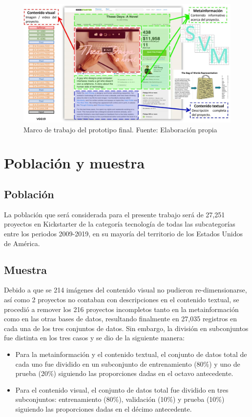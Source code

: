 \begin{figure}[htbp]
	\begin{center}
		\includegraphics[width=1\textwidth]{3/figures/prototipo.jpg}
		\caption{Marco de trabajo del prototipo final. Fuente: Elaboración propia}
		\label{3:fig1}
	\end{center}
\end{figure}

\section{Población y muestra}

\subsection{Población}
La población que será considerada para el presente trabajo será de 27,251 proyectos en Kickstarter de la categoría tecnología de todas las subcategorías entre los periodos 2009-2019, en su mayoría del territorio de los Estados Unidos de América.

\subsection{Muestra}
Debido a que se 214 imágenes del contenido visual no pudieron re-dimensionarse, así como 2 proyectos no contaban con descripciones en el contenido textual, se procedió a remover los 216 proyectos incompletos tanto en la metainformación como en las otras bases de datos, resultando finalmente en 27,035 registros en cada una de los tres conjuntos de datos. Sin embargo, la división en subconjuntos fue distinta en los tres casos y se dio de la siguiente manera:

\begin{itemize}
	\item Para la metainformación y el contenido textual, el conjunto de datos total de cada uno fue dividido en un subconjunto de entrenamiento (80\%) y uno de prueba (20\%) siguiendo las proporciones dadas en el octavo antecedente.
	\item Para el contenido visual, el conjunto de datos total fue dividido en tres subconjuntos: entrenamiento (80\%), validación (10\%) y prueba (10\%) siguiendo las proporciones dadas en el décimo antecedente.
\end{itemize}

